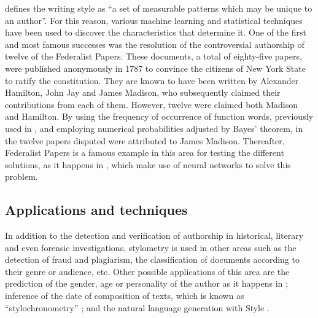 \cite{neuronalstylometry} defines the writing style as ``a set of measurable patterns which may be unique to an author''. For this reason, various machine learning and statistical techniques have been used to discover the characteristics that determine it. One of the first and most famous successes was the resolution of the controversial authorship of twelve of the Federalist Papers. These documents, a total of eighty-five papers, were published anonymously in 1787 to convince the citizens of New York State to ratify the constitution. They are known to have been written by Alexander Hamilton, John Jay and James Madison, who subsequently claimed their contributions from each of them. However, twelve were claimed both Madison and Hamilton. By using the frequency of occurrence of function words, previously used in \cite{juniusletters}, and employing numerical probabilities adjusted by Bayes' theorem, in \cite{federalistpapers} the twelve papers disputed were attributed to James Madison. Thereafter, Federalist Papers is a famous example in this area for testing the different solutions, as it happens in \cite{neuronalstylometry}, which make use of neural networks to solve this problem.

\subsection{Applications and techniques}\label{ssect:techstylo}
In addition to the detection and verification of authorship in historical, literary and even forensic investigations, stylometry is used in other areas such as the detection of fraud and plagiarism, the classification of documents according to their genre or audience, etc. Other possible applications of this area are the prediction of the gender, age or personality of the author as it happens in \cite{schwartz2013personality}; inference of the date of composition of texts, which is known as ``stylochronometry'' \citep{stamou2007stylochronometry, juola2007becoming}; and the natural language generation with Style \citep[Section 5.1]{nlgsoa}.

